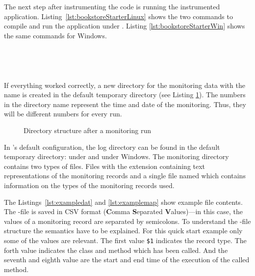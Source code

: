 \noindent %
The next step after instrumenting the code is running the instrumented application. Listing~\ref{lst:bookstoreStarterLinux} shows the two commands to compile and run the application under \UnixLikeSystems{}. Listing \ref{lst:bookstoreStarterWin} shows the same commands for Windows.

\setBashListing 		
	



\quad\


\quad\

\noindent If everything worked correctly, a new directory for the monitoring data with the name  is created in the default temporary directory (see Listing \ref{fig:logtree}). The numbers in the directory name represent the time and date of the monitoring. Thus, they will be different numbers for every run.

\begin{figure}[H]
\begin{graybox}
\end{graybox}
\caption{Directory structure after a monitoring run}
\label{fig:logtree}
\end{figure}

\noindent In \Kieker's default configuration, the log directory can be found in the default temporary directory:  under \UnixLikeSystems{} and  under Windows. The monitoring directory contains two types of files. Files with the extension  containing text representations of the monitoring records and a single file named  which contains information on the types of the monitoring records used. 

The Listings~\ref{lst:exampledat} and \ref{lst:examplemap} show example file contents. The -file is saved in CSV format (\textbf{C}omma \textbf{S}eparated \textbf{V}alues)---in this case, the values of a monitoring record are separated by semicolons. To understand the -file structure the semantics have to be explained. For this quick start example only some of the values are relevant. The first value \verb!$1! indicates the record type. The forth value indicates the class and method which has been called. And the seventh and eighth value are the start and end time of the execution of the called method.

